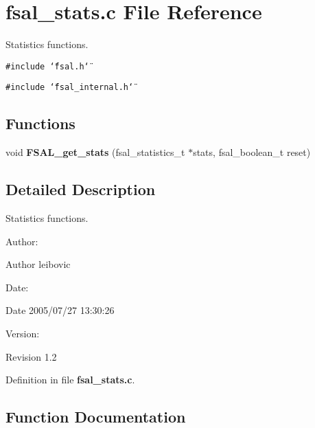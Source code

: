 \section{fsal\_\-stats.c File Reference}
\label{fsal__stats_8c}
Statistics functions.  


{\tt \#include \char`\"{}fsal.h\char`\"{}}\par
{\tt \#include \char`\"{}fsal\_\-internal.h\char`\"{}}\par
\subsection*{Functions}
\begin{CompactItemize}
\item 
void {\bf FSAL\_\-get\_\-stats} (fsal\_\-statistics\_\-t $\ast$stats, fsal\_\-boolean\_\-t reset)
\end{CompactItemize}


\subsection{Detailed Description}
Statistics functions. 

\begin{Desc}
\item[Author:]\end{Desc}
\begin{Desc}
\item[Author]leibovic \end{Desc}
\begin{Desc}
\item[Date:]\end{Desc}
\begin{Desc}
\item[Date]2005/07/27 13:30:26 \end{Desc}
\begin{Desc}
\item[Version:]\end{Desc}
\begin{Desc}
\item[Revision]1.2 \end{Desc}


Definition in file {\bf fsal\_\-stats.c}.

\subsection{Function Documentation}
